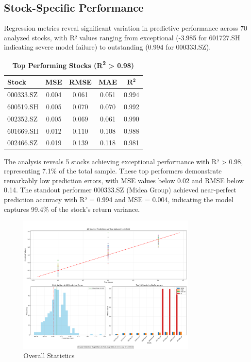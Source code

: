 \documentclass[3p,times,procedia]{elsarticle}
\begin{document}
\subsection{Stock-Specific Performance}
Regression metrics reveal significant variation in predictive performance across 70 analyzed stocks, with R² values ranging from exceptional (-3.985 for 601727.SH indicating severe model failure) to outstanding (0.994 for 000333.SZ).

\begin{table}[!ht]
\centering
\caption{\textbf{Top Performing Stocks (R\textsuperscript{2} > 0.98)}}
\renewcommand{\arraystretch}{1.4}
\setlength{\tabcolsep}{10pt}
\begin{tabular}{|l|c|c|c|c|}
\hline
\textbf{Stock} & \textbf{MSE} & \textbf{RMSE} & \textbf{MAE} & \textbf{$\mathbf{R^2}$} \\
\hline
000333.SZ  & 0.004 & 0.061 & 0.051 & 0.994 \\
600519.SH  & 0.005 & 0.070 & 0.070 & 0.992 \\
002352.SZ  & 0.005 & 0.069 & 0.061 & 0.990 \\
601669.SH  & 0.012 & 0.110 & 0.108 & 0.988 \\
002466.SZ  & 0.019 & 0.139 & 0.118 & 0.981 \\
\hline
\end{tabular}
\end{table}

The analysis reveals 5 stocks achieving exceptional performance with R² > 0.98, representing 7.1\% of the total sample. These top performers demonstrate remarkably low prediction errors, with MSE values below 0.02 and RMSE below 0.14. The standout performer 000333.SZ (Midea Group) achieved near-perfect prediction accuracy with R² = 0.994 and MSE = 0.004, indicating the model captures 99.4\% of the stock's return variance.
\begin{figure}[!ht] %
    \centering
    \includegraphics[width=0.80\textwidth]{Picture3.png} %

    \caption{Overall Statistics}
    \label{fig:Return Forecast Calculation}
\end{figure}
\end{document}
